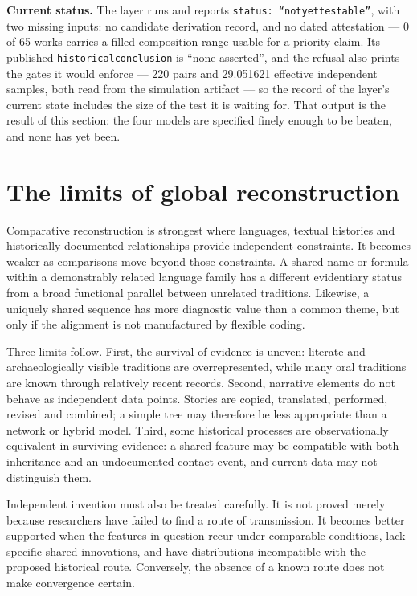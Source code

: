 \documentclass[11pt]{article}
\DeclareRobustCommand{\_}{\textunderscore\allowbreak}
\begin{document}
\textbf{Current status.} The layer runs and reports
\texttt{status: ``not\_yet\_testable''}, with two missing inputs: no candidate
derivation record, and no dated attestation --- 0 of 65 works carries a filled
composition range usable for a priority claim. Its published
\texttt{historical\_conclusion} is ``none asserted'', and the refusal also prints the
gates it would enforce --- 220 pairs and 29.051621 effective independent samples, both
read from the simulation artifact --- so the record of the layer's current state
includes the size of the test it is waiting for. That output is the result of
this section: the four models are specified finely enough to be beaten, and none
has yet been.

\section{The limits of global reconstruction}

Comparative reconstruction is strongest where languages, textual histories and
historically documented relationships provide independent constraints. It becomes
weaker as comparisons move beyond those constraints. A shared name or formula
within a demonstrably related language family has a different evidentiary status
from a broad functional parallel between unrelated traditions. Likewise, a
uniquely shared sequence has more diagnostic value than a common theme, but only
if the alignment is not manufactured by flexible coding.

Three limits follow. First, the survival of evidence is uneven: literate and
archaeologically visible traditions are overrepresented, while many oral
traditions are known through relatively recent records. Second, narrative elements
do not behave as independent data points. Stories are copied, translated,
performed, revised and combined; a simple tree may therefore be less appropriate
than a network or hybrid model. Third, some historical processes are
observationally equivalent in surviving evidence: a shared feature may be
compatible with both inheritance and an undocumented contact event, and current
data may not distinguish them.

Independent invention must also be treated carefully. It is not proved merely
because researchers have failed to find a route of transmission. It becomes better
supported when the features in question recur under comparable conditions, lack
specific shared innovations, and have distributions incompatible with the proposed
historical route. Conversely, the absence of a known route does not make
convergence certain.
\end{document}
